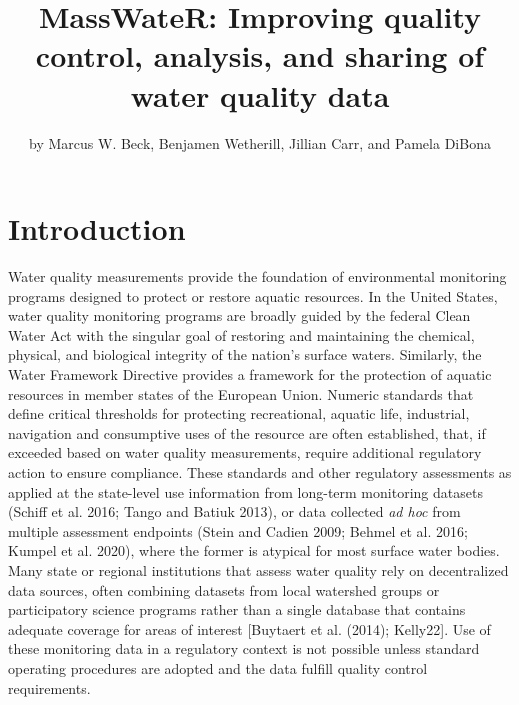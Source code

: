 \title{MassWateR: Improving quality control, analysis, and sharing of water quality data}
\author{by Marcus W. Beck, Benjamen Wetherill, Jillian Carr, and Pamela DiBona}

\maketitle


\hypertarget{introduction}{%
\section{Introduction}\label{introduction}}

Water quality measurements provide the foundation of environmental monitoring programs designed to protect or restore aquatic resources. In the United States, water quality monitoring programs are broadly guided by the federal Clean Water Act with the singular goal of restoring and maintaining the chemical, physical, and biological integrity of the nation's surface waters. Similarly, the Water Framework Directive provides a framework for the protection of aquatic resources in member states of the European Union. Numeric standards that define critical thresholds for protecting recreational, aquatic life, industrial, navigation and consumptive uses of the resource are often established, that, if exceeded based on water quality measurements, require additional regulatory action to ensure compliance. These standards and other regulatory assessments as applied at the state-level use information from long-term monitoring datasets (Schiff et al. 2016; Tango and Batiuk 2013), or data collected \emph{ad hoc} from multiple assessment endpoints (Stein and Cadien 2009; Behmel et al. 2016; Kumpel et al. 2020), where the former is atypical for most surface water bodies. Many state or regional institutions that assess water quality rely on decentralized data sources, often combining datasets from local watershed groups or participatory science programs rather than a single database that contains adequate coverage for areas of interest {[}Buytaert et al. (2014); Kelly22{]}. Use of these monitoring data in a regulatory context is not possible unless standard operating procedures are adopted and the data fulfill quality control requirements.


